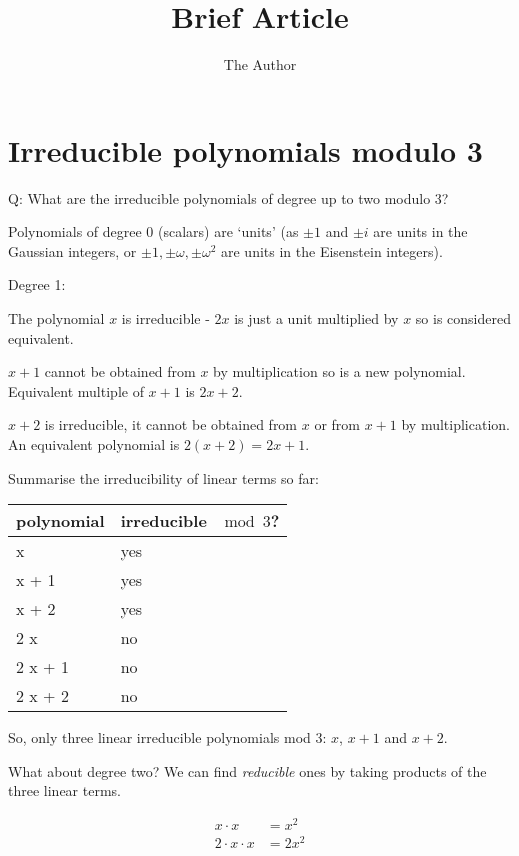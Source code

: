 \documentclass[11pt]{amsart}
\title{Brief Article}
\author{The Author}
\begin{document}
\section{Irreducible polynomials modulo 3}

Q: What are the irreducible polynomials of degree up to two modulo 3?


Polynomials of degree 0 (scalars) are `units' (as $\pm 1$ and $\pm i$ are units in the Gaussian integers, or $\pm 1, \pm \omega, \pm \omega^2$ are units in the Eisenstein integers).


Degree 1:

The polynomial $x$ is irreducible - $2 x$ is just a unit multiplied by $x$ so is considered equivalent.

$x + 1$ cannot be obtained from $x$ by multiplication so is a new polynomial. Equivalent multiple of $x + 1$ is $2x + 2$.

$x + 2$ is irreducible, it cannot be obtained from $x$ or from $x+1$ by multiplication. An equivalent polynomial is $2 (x + 2) = 2x + 1$.

Summarise the irreducibility of linear terms so far:
\begin{center}
\begin{tabular}{ll}
polynomial & irreducible $\mod 3$? \\
\hline
x & yes \\
x + 1 & yes \\
x + 2 & yes \\
2 x  & no\\
2 x + 1 & no \\
2 x + 2 & no
\end{tabular}
\end{center}


So, only three linear irreducible polynomials mod 3: $x$, $x+1$ and $x+2$.

What about degree two? We can find \emph{reducible} ones by taking products of the three linear terms.



$$
\begin{aligned}
x \cdot x &= x^2  \\
2 \cdot x \cdot x &= 2 x^2
\end{aligned}
$$
\end{document}
